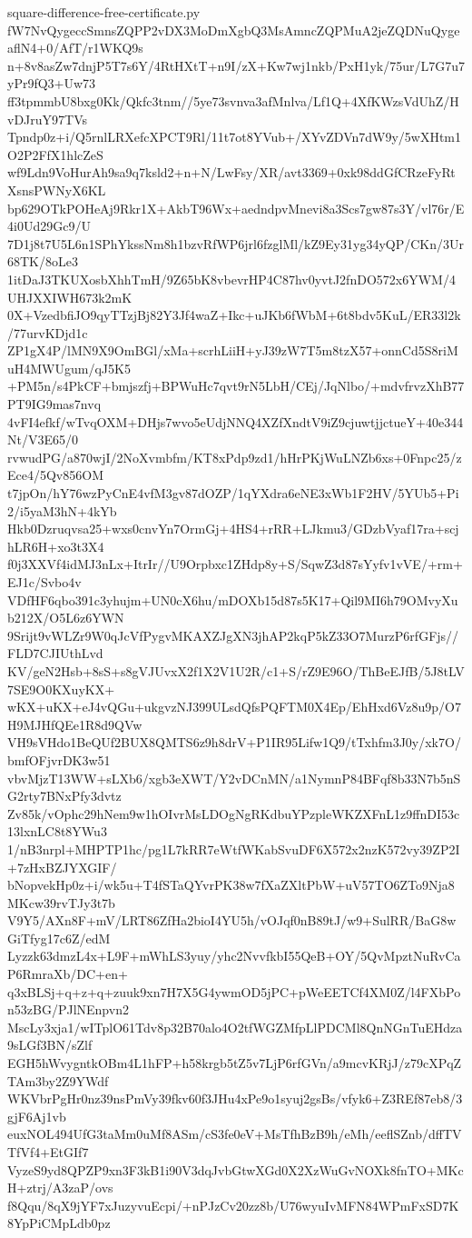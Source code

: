 \documentclass[11pt]{article}
\theoremstyle{definition}
\theoremstyle{remark}
\begin{document}
\begin{filecontents*}[overwrite]{square-difference-free-certificate.py}
fW7NvQygeccSmnsZQPP2vDX3MoDmXgbQ3MsAmncZQPMuA2jeZQDNuQygeaflN4+0/AfT/r1WKQ9s
n+8v8asZw7dnjP5T7s6Y/4RtHXtT+n9I/zX+Kw7wj1nkb/PxH1yk/75ur/L7G7u7yPr9fQ3+Uw73
ff3tpmmbU8bxg0Kk/Qkfc3tnm//5ye73svnva3afMnlva/Lf1Q+4XfKWzsVdUhZ/HvDJruY97TVs
Tpndp0z+i/Q5rnlLRXefcXPCT9Rl/11t7ot8YVub+/XYvZDVn7dW9y/5wXHtm1O2P2FfX1hlcZeS
wf9Ldn9VoHurAh9sa9q7ksld2+n+N/LwFsy/XR/avt3369+0xk98ddGfCRzeFyRtXsnsPWNyX6KL
bp629OTkPOHeAj9Rkr1X+AkbT96Wx+aedndpvMnevi8a3Scs7gw87s3Y/vl76r/E4i0Ud29Gc9/U
7D1j8t7U5L6n1SPhYkssNm8h1bzvRfWP6jrl6fzglMl/kZ9Ey31yg34yQP/CKn/3Ur68TK/8oLe3
1itDaJ3TKUXosbXhhTmH/9Z65bK8vbevrHP4C87hv0yvtJ2fnDO572x6YWM/4UHJXXIWH673k2mK
0X+VzedbfiJO9qyTTzjBj82Y3Jf4waZ+Ikc+uJKb6fWbM+6t8bdv5KuL/ER33l2k/77urvKDjd1c
ZP1gX4P/lMN9X9OmBGl/xMa+scrhLiiH+yJ39zW7T5m8tzX57+onnCd5S8riMuH4MWUgum/qJ5K5
+PM5n/s4PkCF+bmjszfj+BPWuHc7qvt9rN5LbH/CEj/JqNlbo/+mdvfrvzXhB77PT9IG9mas7nvq
4vFI4efkf/wTvqOXM+DHjs7wvo5eUdjNNQ4XZfXndtV9iZ9cjuwtjjctueY+40e344Nt/V3E65/0
rvwudPG/a870wjI/2NoXvmbfm/KT8xPdp9zd1/hHrPKjWuLNZb6xs+0Fnpc25/zEce4/5Qv856OM
t7jpOn/hY76wzPyCnE4vfM3gv87dOZP/1qYXdra6eNE3xWb1F2HV/5YUb5+Pi2/i5yaM3hN+4kYb
Hkb0Dzruqvsa25+wxs0cnvYn7OrmGj+4HS4+rRR+LJkmu3/GDzbVyaf17ra+scjhLR6H+xo3t3X4
f0j3XXVf4idMJ3nLx+ItrIr//U9Orpbxc1ZHdp8y+S/SqwZ3d87sYyfv1vVE/+rm+EJ1c/Svbo4v
VDfHF6qbo391c3yhujm+UN0cX6hu/mDOXb15d87s5K17+Qil9MI6h79OMvyXub212X/O5L6z6YWN
9Srijt9vWLZr9W0qJcVfPygvMKAXZJgXN3jhAP2kqP5kZ33O7MurzP6rfGFjs//FLD7CJIUthLvd
KV/geN2Hsb+8sS+s8gVJUvxX2f1X2V1U2R/c1+S/rZ9E96O/ThBeEJfB/5J8tLV7SE9O0KXuyKX+
wKX+uKX+eJ4vQGu+ukgvzNJ399ULsdQfsPQFTM0X4Ep/EhHxd6Vz8u9p/O7H9MJHfQEe1R8d9QVw
VH9sVHdo1BeQUf2BUX8QMTS6z9h8drV+P1IR95Lifw1Q9/tTxhfm3J0y/xk7O/bmfOFjvrDK3w51
vbvMjzT13WW+sLXb6/xgb3eXWT/Y2vDCnMN/a1NymnP84BFqf8b33N7b5nSG2rty7BNxPfy3dvtz
Zv85k/vOphc29hNem9w1hOIvrMsLDOgNgRKdbuYPzpleWKZXFnL1z9ffnDI53c13lxnLC8t8YWu3
1/nB3nrpl+MHPTP1hc/pg1L7kRR7eWtfWKabSvuDF6X572x2nzK572vy39ZP2I+7zHxBZJYXGIF/
bNopvekHp0z+i/wk5u+T4fSTaQYvrPK38w7fXaZXltPbW+uV57TO6ZTo9Nja8MKcw39rvTJy3t7b
V9Y5/AXn8F+mV/LRT86ZfHa2bioI4YU5h/vOJqf0nB89tJ/w9+SulRR/BaG8wGiTfyg17c6Z/edM
Lyzzk63dmzL4x+L9F+mWhLS3yuy/yhc2NvvfkbI55QeB+OY/5QvMpztNuRvCaP6RmraXb/DC+en+
q3xBLSj+q+z+q+zuuk9xn7H7X5G4ywmOD5jPC+pWeEETCf4XM0Z/l4FXbPon53zBG/PJlNEnpvn2
MscLy3xja1/wITplO61Tdv8p32B70alo4O2tfWGZMfpLlPDCMl8QnNGnTuEHdza9sLGf3BN/sZlf
EGH5hWvygntkOBm4L1hFP+h58krgb5tZ5v7LjP6rfGVn/a9mcvKRjJ/z79cXPqZTAm3by2Z9YWdf
WKVbrPgHr0nz39nsPmVy39fkv60f3JHu4xPe9o1syuj2gsBs/vfyk6+Z3REf87eb8/3gjF6Aj1vb
euxNOL494UfG3taMm0uMf8ASm/cS3fe0eV+MsTfhBzB9h/eMh/eeflSZnb/dffTVTfVf4+EtGIf7
VyzeS9yd8QPZP9xn3F3kB1i90V3dqJvbGtwXGd0X2XzWuGvNOXk8fnTO+MKcH+ztrj/A3zaP/ovs
f8Qqu/8qX9jYF7xJuzyvuEcpi/+nPJzCv20zz8b/U76wyuIvMFN84WPmFxSD7K8YpPiCMpLdb0pz

\end{filecontents*}
\end{document}
